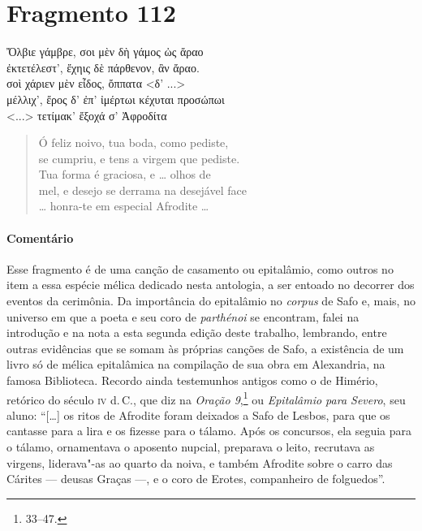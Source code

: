 \section{Fragmento 112}

\begin{gkverse}
Ὄλβιε γάμβρε, σοι μὲν δὴ γάμος ὠς ἄραο\\
ἐκτετέλεστ’, ἔχηις δὲ πάρθενον, ἂν ἄραο.\\
σοὶ χάριεν μὲν εἶδος, ὄππατα <δ’ ...>\\
μέλλιχ’, ἔρος δ’ ἐπ’ ἰμέρτωι κέχυται προσώπωι\\
<...> τετίμακ’ ἔξοχά σ’ Ἀφροδίτα
\end{gkverse}

\begin{verse}
Ó feliz noivo, tua boda, como pediste,\\
se cumpriu, e tens a virgem que pediste.\\
Tua forma é graciosa, e \ldots{} olhos de\\
mel, e desejo se derrama na desejável face\\
\ldots{} honra-te em especial Afrodite \ldots{}
\end{verse}

\medskip

\paragraph{Comentário} Esse fragmento é de uma canção de casamento ou epitalâmio, como outros no item a essa espécie mélica dedicado nesta antologia, a ser entoado no decorrer dos eventos da cerimônia.
Da importância do epitalâmio no \emph{corpus} de Safo e, mais, no universo em que a poeta e seu coro de \emph{parthénoi} se encontram, falei na introdução e na nota a esta segunda edição deste trabalho, lembrando, entre outras evidências que se somam às próprias canções de Safo, a existência de um livro só de mélica epitalâmica na compilação de sua obra  em Alexandria, na famosa Biblioteca. Recordo ainda testemunhos antigos como o de Himério, retórico do século \textsc{iv} d.\,C., que diz na \emph{Oração 9},\footnote{33--47.} ou \emph{Epitalâmio para Severo}, seu aluno: ``[\ldots{}] os ritos de Afrodite foram deixados a Safo de Lesbos, para que os cantasse para a lira e os fizesse para o tálamo. Após os concursos, ela seguia para o tálamo, ornamentava o aposento nupcial, preparava o leito, recrutava as virgens, liderava"-as ao quarto da noiva, e também Afrodite sobre o carro das Cárites --- deusas Graças ---, e o coro de Erotes, companheiro de folguedos''.

